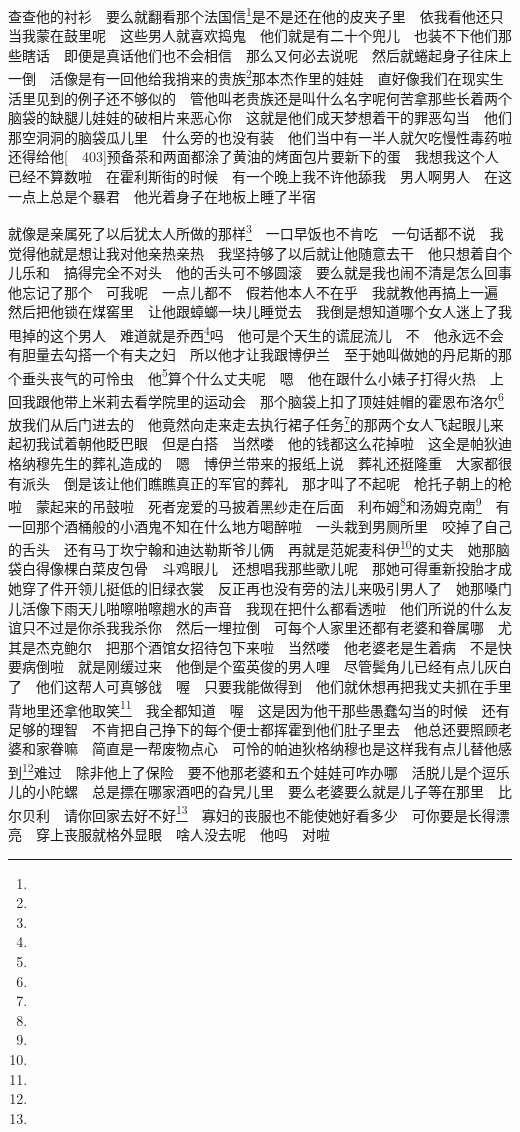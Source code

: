 \par 查查他的衬衫　要么就翻看那个法国信\footnote{}是不是还在他的皮夹子里　依我看他还只当我蒙在鼓里呢　这些男人就喜欢捣鬼　他们就是有二十个兜儿　也装不下他们那些瞎话　即便是真话他们也不会相信　那么又何必去说呢　然后就蜷起身子往床上一倒　活像是有一回他给我捎来的贵族\footnote{}那本杰作里的娃娃　直好像我们在现实生活里见到的例子还不够似的　管他叫老贵族还是叫什么名字呢何苦拿那些长着两个脑袋的缺腿儿娃娃的破相片来恶心你　这就是他们成天梦想着干的罪恶勾当　他们那空洞洞的脑袋瓜儿里　什么旁的也没有装　他们当中有一半人就欠吃慢性毒药啦　还得给他[　403]预备茶和两面都涂了黄油的烤面包片要新下的蛋　我想我这个人已经不算数啦　在霍利斯街的时候　有一个晚上我不许他舔我　男人啊男人　在这一点上总是个暴君　他光着身子在地板上睡了半宿　
\par 就像是亲属死了以后犹太人所做的那样\footnote{}　一口早饭也不肯吃　一句话都不说　我觉得他就是想让我对他亲热亲热　我坚持够了以后就让他随意去干　他只想着自个儿乐和　搞得完全不对头　他的舌头可不够圆滚　要么就是我也闹不清是怎么回事　他忘记了那个　可我呢　一点儿都不　假若他本人不在乎　我就教他再搞上一遍　然后把他锁在煤窖里　让他跟蟑螂一块儿睡觉去　我倒是想知道哪个女人迷上了我甩掉的这个男人　难道就是乔西\footnote{}吗　他可是个天生的谎屁流儿　不　他永远不会有胆量去勾搭一个有夫之妇　所以他才让我跟博伊兰　至于她叫做她的丹尼斯的那个垂头丧气的可怜虫　他\footnote{}算个什么丈夫呢　嗯　他在跟什么小婊子打得火热　上回我跟他带上米莉去看学院里的运动会　那个脑袋上扣了顶娃娃帽的霍恩布洛尔\footnote{}放我们从后门进去的　他竟然向走来走去执行裙子任务\footnote{}的那两个女人飞起眼儿来　起初我试着朝他眨巴眼　但是白搭　当然喽　他的钱都这么花掉啦　这全是帕狄迪格纳穆先生的葬礼造成的　嗯　博伊兰带来的报纸上说　葬礼还挺隆重　大家都很有派头　倒是该让他们瞧瞧真正的军官的葬礼　那才叫了不起呢　枪托子朝上的枪啦　蒙起来的吊鼓啦　死者宠爱的马披着黑纱走在后面　利布姆\footnote{}和汤姆克南\footnote{}　有一回那个酒桶般的小酒鬼不知在什么地方喝醉啦　一头栽到男厕所里　咬掉了自己的舌头　还有马丁坎宁翰和迪达勒斯爷儿俩　再就是范妮麦科伊\footnote{}的丈夫　她那脑袋白得像棵白菜皮包骨　斗鸡眼儿　还想唱我那些歌儿呢　那她可得重新投胎才成　她穿了件开领儿挺低的旧绿衣裳　反正再也没有旁的法儿来吸引男人了　她那嗓门儿活像下雨天儿啪嚓啪嚓趟水的声音　我现在把什么都看透啦　他们所说的什么友谊只不过是你杀我我杀你　然后一埋拉倒　可每个人家里还都有老婆和眷属哪　尤其是杰克鲍尔　把那个酒馆女招待包下来啦　当然喽　他老婆老是生着病　不是快要病倒啦　就是刚缓过来　他倒是个蛮英俊的男人哩　尽管鬓角儿已经有点儿灰白了　他们这帮人可真够戗　喔　只要我能做得到　他们就休想再把我丈夫抓在手里　背地里还拿他取笑\footnote{}　我全都知道　喔　这是因为他干那些愚蠢勾当的时候　还有足够的理智　不肯把自己挣下的每个便士都挥霍到他们肚子里去　他总还要照顾老婆和家眷嘛　简直是一帮废物点心　可怜的帕迪狄格纳穆也是这样我有点儿替他感到\footnote{}难过　除非他上了保险　要不他那老婆和五个娃娃可咋办哪　活脱儿是个逗乐儿的小陀螺　总是摽在哪家酒吧的旮旯儿里　要么老婆要么就是儿子等在那里　比尔贝利　请你回家去好不好\footnote{}　寡妇的丧服也不能使她好看多少　可你要是长得漂亮　穿上丧服就格外显眼　啥人没去呢　他吗　对啦　
